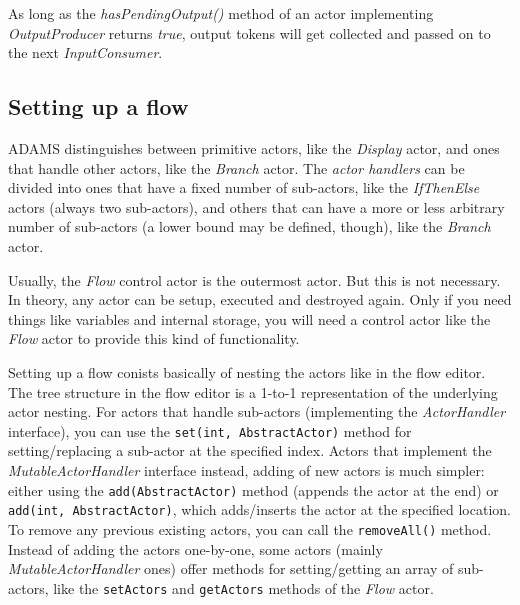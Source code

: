 As long as the \textit{hasPendingOutput()} method of an actor implementing
\textit{OutputProducer} returns \textit{true}, output tokens will get collected
and passed on to the next \textit{InputConsumer}.

\subsection{Setting up a flow}
ADAMS distinguishes between primitive actors, like the \textit{Display} actor,
and ones that handle other actors, like the \textit{Branch} actor. The 
\textit{actor handlers} can be divided into ones that have a fixed number
of sub-actors, like the \textit{IfThenElse} actors (always two sub-actors),
and others that can have a more or less arbitrary number of sub-actors (a 
lower bound may be defined, though), like the \textit{Branch} actor.

Usually, the \textit{Flow} control actor is the outermost actor. But this is
not necessary. In theory, any actor can be setup, executed and destroyed again.
Only if you need things like variables and internal storage, you will need a 
control actor like the \textit{Flow} actor to provide this kind of functionality.

Setting up a flow conists basically of nesting the actors like in the flow
editor. The tree structure in the flow editor is a 1-to-1 representation of the
underlying actor nesting. For actors that handle sub-actors (implementing the
\textit{ActorHandler} interface), you can use the \texttt{set(int,
AbstractActor)} method for setting/replacing a sub-actor at the specified index.
Actors that implement the \textit{MutableActorHandler} interface instead, adding
of new actors is much simpler: either using the \texttt{add(AbstractActor)}
method (appends the actor at the end) or \texttt{add(int, AbstractActor)}, which
adds/inserts the actor at the specified location. To remove any previous 
existing actors, you can call the \texttt{removeAll()} method. Instead of adding
the actors one-by-one, some actors (mainly \textit{MutableActorHandler} ones) 
offer methods for setting/getting an array of sub-actors, like the 
\texttt{setActors} and \texttt{getActors} methods of the \textit{Flow} actor.

